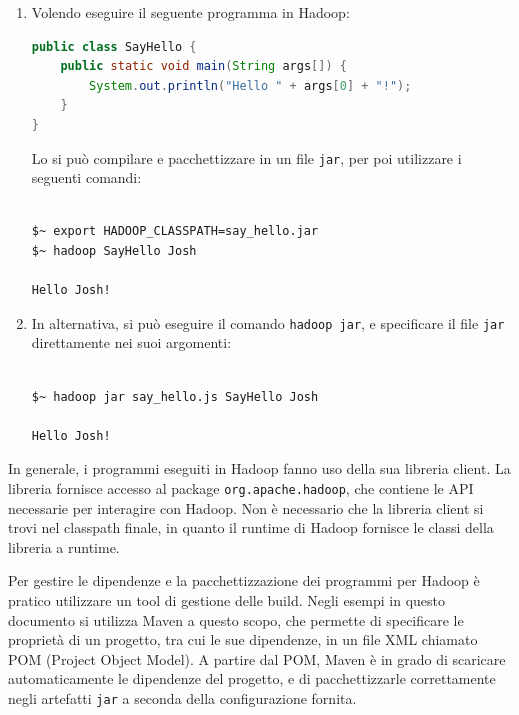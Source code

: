 \documentclass[italian,a4paper, twoside, 12pt]{report}
\begin{document}
\begin{enumerate}
\def\labelenumi{(\arabic{enumi})}
\item
  Volendo eseguire il seguente programma in Hadoop:

\begin{lstlisting}[language=Java]
public class SayHello {
    public static void main(String args[]) {
        System.out.println("Hello " + args[0] + "!");
    }
}
\end{lstlisting}

  Lo si può compilare e pacchettizzare in un file \lstinline!jar!, per
  poi utilizzare i seguenti comandi:

\begin{lstlisting}[language=sh]

$~ export HADOOP_CLASSPATH=say_hello.jar 
$~ hadoop SayHello Josh

Hello Josh!
\end{lstlisting}
\item
  In alternativa, si può eseguire il comando \lstinline!hadoop jar!, e
  specificare il file \lstinline!jar! direttamente nei suoi argomenti:

\begin{lstlisting}[language=sh]

$~ hadoop jar say_hello.js SayHello Josh

Hello Josh!
\end{lstlisting}
\end{enumerate}

In generale, i programmi eseguiti in Hadoop fanno uso della sua libreria
client. La libreria fornisce accesso al package
\lstinline!org.apache.hadoop!, che contiene le API necessarie per
interagire con Hadoop. Non è necessario che la libreria client si trovi
nel classpath finale, in quanto il runtime di Hadoop fornisce le classi
della libreria a runtime.

Per gestire le dipendenze e la pacchettizzazione dei programmi per
Hadoop è pratico utilizzare un tool di gestione delle build. Negli
esempi in questo documento si utilizza Maven a questo scopo, che
permette di specificare le proprietà di un progetto, tra cui le sue
dipendenze, in un file XML chiamato POM (Project Object Model). A
partire dal POM, Maven è in grado di scaricare automaticamente le
dipendenze del progetto, e di pacchettizzarle correttamente negli
artefatti \lstinline!jar! a seconda della configurazione fornita.
\end{document}
